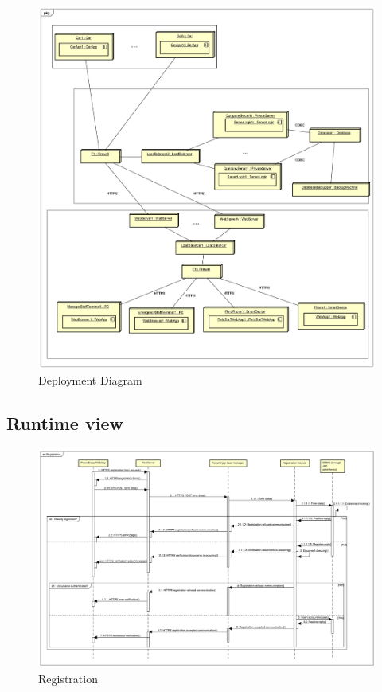 \documentclass[english]{article}
\begin{document}
			\begin{figure}[H]
				\centering
				\includegraphics[scale=0.221875]{Deployment_Diagram.pdf}%
				\caption{Deployment Diagram}
			\end{figure}
	\begin{landscape}
	\subsection{Runtime view}%
		\begin{figure}[H]
				\centering
				\includegraphics[scale=0.22]{./SequenceDiagrams/Registration/Registration.pdf}%
				\caption{Registration}
		\end{figure}
	\end{landscape}
\end{document}
